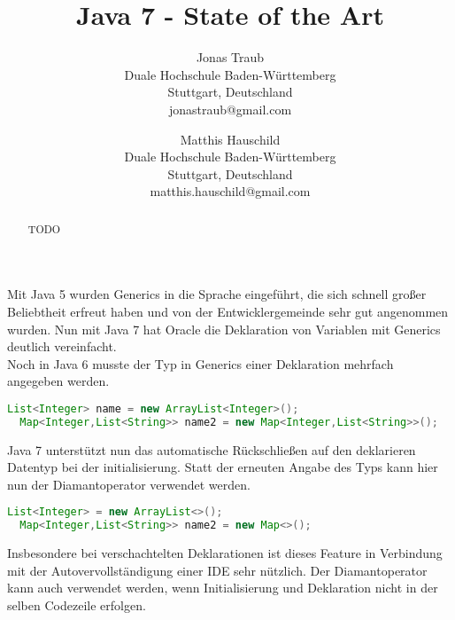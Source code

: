 \documentclass[times, 10pt,twocolumn]{article}
\begin{document}
\title{Java 7 - State of the Art}

\author{Jonas Traub\\
Duale Hochschule Baden-Württemberg\\
Stuttgart, Deutschland\\
jonastraub@gmail.com
\and
Matthis Hauschild\\
Duale Hochschule Baden-Württemberg\\
Stuttgart, Deutschland\\
matthis.hauschild@gmail.com\\
}

\maketitle
\thispagestyle{empty}

\begin{abstract}
TODO 
\end{abstract}


Mit Java 5 wurden Generics in die Sprache eingeführt, die sich schnell großer Beliebtheit erfreut haben und von der Entwicklergemeinde sehr gut angenommen wurden. Nun mit Java 7 hat Oracle die Deklaration von Variablen mit Generics deutlich vereinfacht\cite{oracleJavaRel}.\\

Noch in Java 6 musste der Typ in Generics einer Deklaration mehrfach angegeben werden.
\begin{lstlisting}[language=java,breaklines=true]
  List<Integer> name = new ArrayList<Integer>();
  Map<Integer,List<String>> name2 = new Map<Integer,List<String>>();
\end{lstlisting}
Java 7 unterstützt nun das automatische Rückschließen auf den deklarieren Datentyp bei der initialisierung.\cite{v2bJava7} Statt der erneuten Angabe des Typs kann hier nun der Diamantoperator verwendet werden.
\begin{lstlisting}[language=java,breaklines=true]
  List<Integer> = new ArrayList<>();
  Map<Integer,List<String>> name2 = new Map<>();
\end{lstlisting}
Insbesondere bei verschachtelten Deklarationen ist dieses Feature in Verbindung mit der Autovervollständigung einer IDE sehr nützlich. Der Diamantoperator kann auch verwendet werden, wenn Initialisierung und Deklaration nicht in der selben Codezeile erfolgen.\cite{v2bJava7}\\
\end{document}
